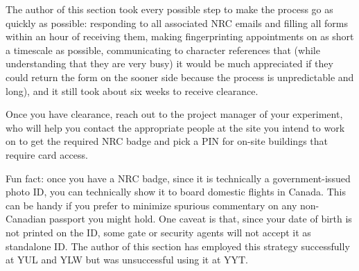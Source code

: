         The author of this section took every possible step to make the process go as quickly as possible: responding to all associated NRC emails and filling all forms within an hour of receiving them, making fingerprinting appointments on as short a timescale as possible, communicating to character references that (while understanding that they are very busy) it would be much appreciated if they could return the form on the sooner side because the process is unpredictable and long), and it still took about six weeks to receive clearance. 

        Once you have clearance, reach out to the project manager of your experiment, who will help you contact the appropriate people at the site you intend to work on to get the required NRC badge and pick a PIN for on-site buildings that require card access.

        Fun fact: once you have a NRC badge, since it is technically a government-issued photo ID, you can technically show it to board domestic flights in Canada. This can be handy if you prefer to minimize spurious commentary on any non-Canadian passport you might hold. One caveat is that, since your date of birth is not printed on the ID, some gate or security agents will not accept it as standalone ID. The author of this section has employed this strategy successfully at YUL and YLW but was unsuccessful using it at YYT.

       

